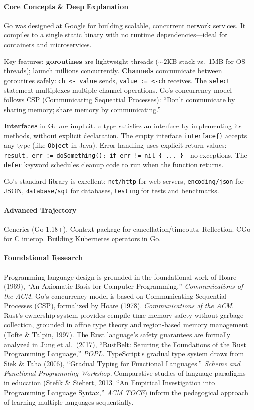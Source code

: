\documentclass[11pt, a4paper, oneside]{report}
\begin{document}
\paragraph{Core Concepts \& Deep Explanation} Go was designed at Google for building scalable, concurrent network services. It compiles to a single static binary with no runtime dependencies---ideal for containers and microservices.

Key features: \textbf{goroutines} are lightweight threads ($\sim$2KB stack vs.\ 1MB for OS threads); launch millions concurrently. \textbf{Channels} communicate between goroutines safely: \texttt{ch <- value} sends, \texttt{value := <-ch} receives. The \texttt{select} statement multiplexes multiple channel operations. Go's concurrency model follows CSP (Communicating Sequential Processes): ``Don't communicate by sharing memory; share memory by communicating.''

\textbf{Interfaces} in Go are implicit: a type satisfies an interface by implementing its methods, without explicit declaration. The empty interface \texttt{interface\{\}} accepts any type (like \texttt{Object} in Java). Error handling uses explicit return values: \texttt{result, err := doSomething(); if err != nil \{ ... \}}---no exceptions. The \texttt{defer} keyword schedules cleanup code to run when the function returns.

Go's standard library is excellent: \texttt{net/http} for web servers, \texttt{encoding/json} for JSON, \texttt{database/sql} for databases, \texttt{testing} for tests and benchmarks.

\paragraph{Advanced Trajectory} Generics (Go 1.18+). Context package for cancellation/timeouts. Reflection. CGo for C interop. Building Kubernetes operators in Go.


\paragraph{Foundational Research} Programming language design is grounded in the foundational work of Hoare (1969), ``An Axiomatic Basis for Computer Programming,'' \emph{Communications of the ACM}. Go's concurrency model is based on Communicating Sequential Processes (CSP), formalized by Hoare (1978), \emph{Communications of the ACM}. Rust's ownership system provides compile-time memory safety without garbage collection, grounded in affine type theory and region-based memory management (Tofte \& Talpin, 1997). The Rust language's safety guarantees are formally analyzed in Jung et al.\ (2017), ``RustBelt: Securing the Foundations of the Rust Programming Language,'' \emph{POPL}. TypeScript's gradual type system draws from Siek \& Taha (2006), ``Gradual Typing for Functional Languages,'' \emph{Scheme and Functional Programming Workshop}. Comparative studies of language paradigms in education (Stefik \& Siebert, 2013, ``An Empirical Investigation into Programming Language Syntax,'' \emph{ACM TOCE}) inform the pedagogical approach of learning multiple languages sequentially.
\end{document}
